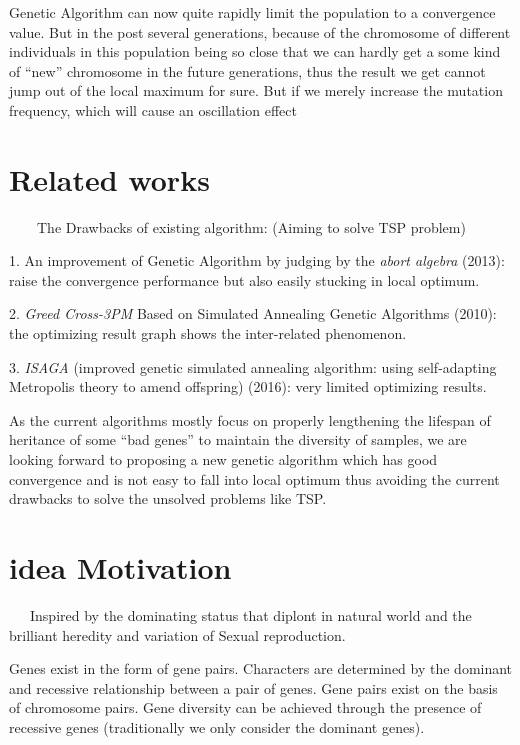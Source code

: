 \documentclass{acmtog} %
\begin{document}
Genetic Algorithm can now quite rapidly limit the population to a convergence value. But in the post several generations, because of the chromosome of different individuals in this population being so close that we can hardly get a some kind of “new” chromosome in the future generations, thus the result we get cannot jump out of the local maximum for sure. But if we merely increase the mutation frequency, which will cause an oscillation effect

\section{Related works}
\label{sec:related_works}

\ \ \ \ The Drawbacks of existing algorithm: (Aiming to solve TSP problem)

1. An improvement of Genetic Algorithm by judging by the \emph{abort algebra} (2013): raise the convergence performance but also easily stucking in local optimum.

2. \emph{Greed Cross-3PM} Based on Simulated Annealing Genetic Algorithms (2010): the optimizing result graph shows the inter-related phenomenon.

3. \emph{ISAGA} (improved genetic simulated annealing algorithm: using self-adapting Metropolis theory to amend offspring) (2016): very limited optimizing results.

As the current algorithms mostly focus on properly lengthening the lifespan of heritance of some “bad genes” to maintain the diversity of samples, we are looking forward to proposing a new genetic algorithm which has good convergence and is not easy to fall into local optimum thus avoiding the current drawbacks to solve the unsolved problems like TSP. 


\section{idea Motivation}
\label{sub:idea_motivation}

\ \ \  Inspired by the dominating status that diplont in natural world and the brilliant heredity and variation of Sexual reproduction.

Genes exist in the form of gene pairs. Characters are determined by the dominant and recessive relationship between a pair of genes. Gene pairs exist on the basis of chromosome pairs. Gene diversity can be achieved through the presence of recessive genes (traditionally we only consider the dominant genes).
\end{document}
